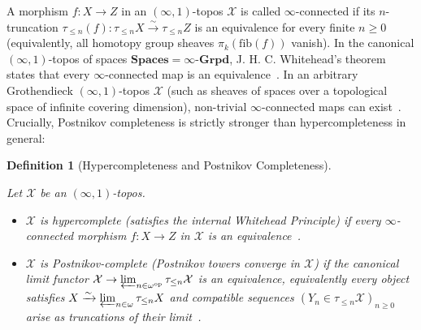 \documentclass[10pt,twoside,openright]{book}
\theoremstyle{crmplain}
\theoremstyle{crmdef}
\newtheorem{definition}[theorem]{Definition}
\theoremstyle{crmremark}
\begin{document}
A morphism $f: X \to Z$ in an $(\infty, 1)$-topos $\mathcal{X}$ is called $\infty$-connected if its $n$-truncation $\tau_{\le n}(f): \tau_{\le n}X \xrightarrow{\sim} \tau_{\le n}Z$ is an equivalence for every finite $n \ge 0$ (equivalently, all homotopy group sheaves $\pi_k(\mathrm{fib}(f))$ vanish). In the canonical $(\infty, 1)$-topos of spaces $\mathbf{Spaces} = \infty\text{-}\mathbf{Grpd}$, J. H. C. Whitehead's theorem states that every $\infty$-connected map is an equivalence~\cite[\S 6.5.2]{Lurie09}. In an arbitrary Grothendieck $(\infty, 1)$-topos $\mathcal{X}$ (such as sheaves of spaces over a topological space of infinite covering dimension), non-trivial $\infty$-connected maps can exist~\cite[\S 6.5.4, \S 7.2.1]{Lurie09}. Crucially, Postnikov completeness is strictly stronger than hypercompleteness in general:

\begin{definition}[Hypercompleteness and Postnikov Completeness]\label{def:hypercomplete}

Let $\mathcal{X}$ be an $(\infty, 1)$-topos.

\begin{itemize}[leftmargin=1.5em]

  \item $\mathcal{X}$ is \emph{hypercomplete} (satisfies the internal Whitehead Principle) if every $\infty$-connected morphism $f: X \to Z$ in $\mathcal{X}$ is an equivalence~\cite[\S 6.5.2]{Lurie09}.

  \item $\mathcal{X}$ is \emph{Postnikov-complete} (Postnikov towers \emph{converge} in $\mathcal{X}$) if the canonical limit functor $\mathcal{X} \to \varprojlim_{n \in \omega^{\mathrm{op}}} \tau_{\le n}\mathcal{X}$ is an equivalence, equivalently every object satisfies $X \xrightarrow{\sim} \varprojlim_{n \in \omega} \tau_{\le n}X$ and compatible sequences $(Y_n \in \tau_{\le n}\mathcal{X})_{n \ge 0}$ arise as truncations of their limit~\cite[\S 5.5.6, \S 7.2.1]{Lurie09}.

\end{itemize}

\end{definition}
\end{document}
